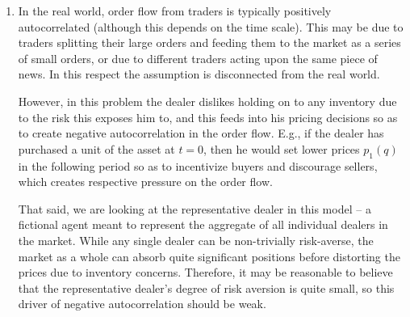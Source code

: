 \begin{solution}
\begin{enumerate}
		
		\item In the real world, order flow from traders is typically positively autocorrelated (although this depends on the time scale). This may be due to traders splitting their large orders and feeding them to the market as a series of small orders, or due to different traders acting upon the same piece of news. In this respect the assumption is disconnected from the real world.
		
		However, in this problem the dealer dislikes holding on to any inventory due to the risk this exposes him to, and this feeds into his pricing decisions so as to create negative autocorrelation in the order flow. E.g., if the dealer has purchased a unit of the asset at $t=0$, then he would set lower prices $p_1(q)$ in the following period so as to incentivize buyers and discourage sellers, which creates respective pressure on the order flow.
		
		That said, we are looking at the representative dealer in this model -- a fictional agent meant to represent the aggregate of all individual dealers in the market. While any single dealer can be non-trivially risk-averse, the market as a whole can absorb quite significant positions before distorting the prices due to inventory concerns. Therefore, it may be reasonable to believe that the representative dealer's degree of risk aversion is quite small, so this driver of negative autocorrelation should be weak.
	\end{enumerate}
\end{solution}




